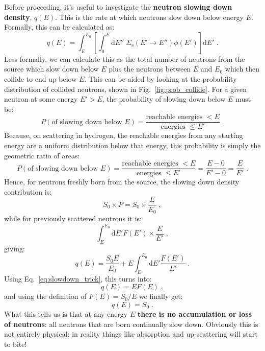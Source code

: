 Before proceeding, it's useful to investigate the \textbf{neutron slowing down density}, $q(E)$. This is the rate at which neutrons slow down below energy $E$. Formally, this can be calculated as:
\begin{equation*}
    q(E) = \int^{E_0}_E\left[\int^E_0\mathrm{d}E''\;\Sigma_\mathrm{s}(E'\rightarrow E'')\phi(E')\right]\mathrm{d}E'\;\mathrm{.}
\end{equation*}
Less formally, we can calculate this as the total number of neutrons from the source which slow down below $E$ plus the neutrons between $E$ and $E_0$ which then collide to end up below $E$. This can be aided by looking at the probability distribution of collided neutrons, shown in Fig.~\ref{fig:prob_collide}. For a given neutron at some energy $E'>E$, the probability of slowing down below $E$ must be:
\begin{equation*}
    P(\text{of slowing down below }E) = \frac{\text{reachable energies }<E}{\text{energies }\leq E'}\;\mathrm{.}
\end{equation*}
Because, on scattering in hydrogen, the reachable energies from any starting energy are a uniform distribution below that energy, this probability is simply the geometric ratio of areas:
\begin{equation*}
    P(\text{of slowing down below }E) = \frac{\text{reachable energies }<E}{\text{energies }\leq E'} = \frac{E - 0}{E' - 0} = \frac{E}{E'}\;\mathrm{.}
\end{equation*}
Hence, for neutrons freshly born from the source, the slowing down density contribution is:
\begin{equation*}
    S_0 \times P = S_0 \times \frac{E}{E_0}\;\mathrm{,}
\end{equation*}
while for previously scattered neutrons it is:
\begin{equation*}
    \int^{E_0}_E\mathrm{d}E' F(E')\times \frac{E}{E'}\;\mathrm{,}
\end{equation*}
giving:
\begin{equation*}
    q(E) = \frac{S_0 E}{E_0} + E \int^{E_0}_E\mathrm{d}E' \frac{F(E')}{E'}\;\mathrm{.}
\end{equation*}
Using Eq.~\eqref{eq:slowdown_trick}, this turns into:
\begin{equation*}
    q(E) = E F(E)\;\mathrm{,}
\end{equation*}
and using the definition of $F(E)=S_0/E$ we finally get:
\begin{equation*}
    q(E) = S_0\;\mathrm{.}
\end{equation*}
What this tells us is that at any energy $E$ \textbf{there is no accumulation or loss of neutrons}: all neutrons that are born continually slow down. Obviously this is not entirely physical: in reality things like absorption and up-scattering will start to bite!

